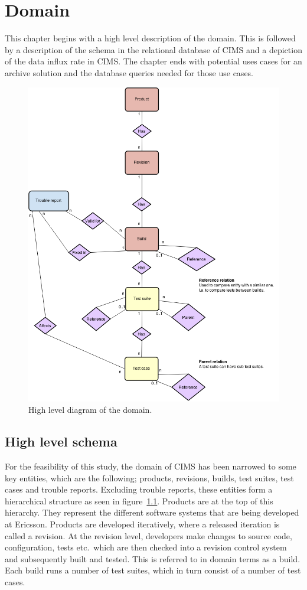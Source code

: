 \chapter{Domain}
\label{chap:domain}

This chapter begins with a high level description of the domain. This is followed by a description of the schema in the relational database of CIMS and a depiction of the data influx rate in CIMS. The chapter ends with potential uses cases for an archive solution and the database queries needed for those use cases.
\begin{figure}[h!]
\centering
\includegraphics[scale=0.45]{figure/er_diagram.png}
\caption{High level diagram of the domain.}
\label{fig:er}
\end{figure}

\section{High level schema}
For the feasibility of this study, the domain of CIMS has been narrowed to some key entities, which are the following; products, revisions, builds, test suites, test cases and trouble reports. Excluding trouble reports, these entities form a hierarchical structure as seen in figure~\ref{fig:er}. Products are at the top of this hierarchy. They represent the different software systems that are being developed at Ericsson. Products are developed iteratively, where a released iteration is called a revision. At the revision level, developers make changes to source code, configuration, tests etc.\ which are then checked into a revision control system and subsequently built and tested. This is referred to in domain terms as a build. Each build runs a number of test suites, which in turn consist of a number of test cases.

